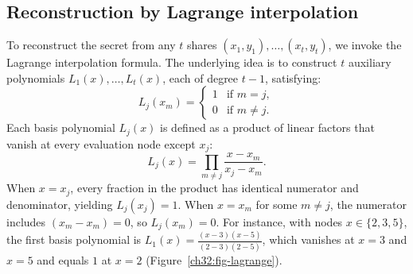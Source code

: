 \subsection{Reconstruction by Lagrange interpolation}
\label{ch32:reconstruct}

To reconstruct the secret from any $t$ shares $(x_1, y_1), \dots, (x_t, y_t)$, we invoke
the Lagrange interpolation formula. The underlying idea is to construct $t$ auxiliary polynomials
$L_1(x), \dots, L_t(x)$, each of degree $t-1$, satisfying:
\[
  L_j(x_m) = \begin{cases} 1 & \text{if } m = j, \\ 0 & \text{if } m \ne j. \end{cases}
\]
Each basis polynomial $L_j(x)$ is defined as a product of linear factors that vanish at every evaluation node except $x_j$:
\[
  L_j(x) = \prod_{m \ne j} \frac{x - x_m}{x_j - x_m}.
\]
When $x = x_j$, every fraction in the product has identical numerator and denominator, yielding $L_j(x_j) = 1$.
When $x = x_m$ for some $m \ne j$, the numerator includes $(x_m - x_m) = 0$, so $L_j(x_m) = 0$. For instance, with nodes $x \in \{2, 3, 5\}$, the first basis polynomial is $L_1(x) = \frac{(x-3)(x-5)}{(2-3)(2-5)}$, which vanishes at $x = 3$ and $x = 5$ and equals $1$ at $x = 2$ (Figure~\ref{ch32:fig-lagrange}).

